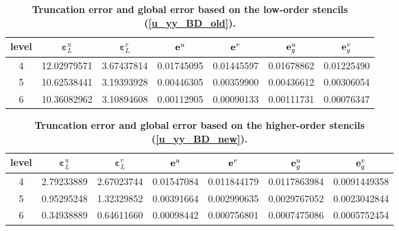 \documentclass[9pt]{article}
\newcommand{\V}[1]{\boldsymbol{#1}}
\begin{document}
\begin{table}[h]
\begin{center}
\begin{tabular}{|c|cc|cc|cc|}
\hline
level     &  ${\V{\varepsilon}}_L^u$  & ${\V{\varepsilon}}_L^v$  &${\bf e}^u$   &${\bf e}^v$   &${\bf e}_g^u$  &${\bf e}_g^v$   \\
\hline
4  &12.02979571 & 3.67437814   &0.01745095  & 0.01445597  & 0.01678862 &  0.01225490   \\
\hline
5  &10.62538441 & 3.19393928   &0.00446305  & 0.00359900  & 0.00436612 &  0.00306054   \\
\hline
6  &10.36082962 & 3.10894608   &0.00112905  & 0.00090133  & 0.00111731 &  0.00076347    \\
\hline
\end{tabular}
\vspace{2mm} \caption{{\bf Truncation error and global error based on the low-order stencils (\ref{u_yy_BD_old}).}}
\end{center}
\end{table}

\begin{table}[h]
\begin{center}
\begin{tabular}{|c|cc|cc|cc|}
\hline
level     &  ${\V{\varepsilon}}_L^u$  & ${\V{\varepsilon}}_L^v$  &${\bf e}^u$   &${\bf e}^v$   &${\bf e}_g^u$  &${\bf e}_g^v$   \\
\hline
4  & 2.79233889 & 2.67023744 & 0.01547084  & 0.011844179 & 0.0117863984 & 0.0091449358  \\
\hline
5  & 0.95295248 & 1.32329852 & 0.00391664  & 0.002990635 & 0.0029767052 & 0.0023042844  \\
\hline
6  & 0.34938889 & 0.64611660 & 0.00098442  & 0.000756801 & 0.0007475086 & 0.0005752454  \\
\hline
\end{tabular}
\vspace{2mm} \caption{{\bf Truncation error and global error based on the higher-order stencils (\ref{u_yy_BD_new}).}}
\end{center}
\end{table}
\end{document}

